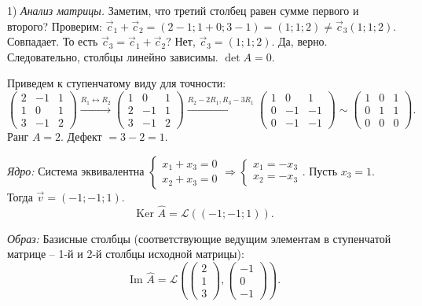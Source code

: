 \documentclass[12pt,a4paper]{article}
\theoremstyle{plain}
\theoremstyle{definition}
\begin{document}
\begin{solbox}
    1) \textit{Анализ матрицы.}
    Заметим, что третий столбец равен сумме первого и второго? Проверим:
    $\vec{c}_1 + \vec{c}_2 = (2-1; 1+0; 3-1) = (1; 1; 2) \neq \vec{c}_3(1; 1; 2)$. Совпадает.
    То есть $\vec{c}_3 = \vec{c}_1 + \vec{c}_2$? Нет, $\vec{c}_3=(1;1;2)$. Да, верно.
    Следовательно, столбцы линейно зависимы. $\det A = 0$.
    
    Приведем к ступенчатому виду для точности:
    \[
    \begin{pmatrix} 2 & -1 & 1 \\ 1 & 0 & 1 \\ 3 & -1 & 2 \end{pmatrix} \xrightarrow{R_1 \leftrightarrow R_2} \begin{pmatrix} 1 & 0 & 1 \\ 2 & -1 & 1 \\ 3 & -1 & 2 \end{pmatrix} \xrightarrow{R_2-2R_1, R_3-3R_1} \begin{pmatrix} 1 & 0 & 1 \\ 0 & -1 & -1 \\ 0 & -1 & -1 \end{pmatrix} \sim \begin{pmatrix} 1 & 0 & 1 \\ 0 & 1 & 1 \\ 0 & 0 & 0 \end{pmatrix}.
    \]
    Ранг $A = 2$. Дефект $= 3 - 2 = 1$.

    \textit{Ядро:} Система эквивалентна $\begin{cases} x_1 + x_3 = 0 \\ x_2 + x_3 = 0 \end{cases} \Rightarrow \begin{cases} x_1 = -x_3 \\ x_2 = -x_3 \end{cases}$.
    Пусть $x_3 = 1$. Тогда $\vec{v} = (-1; -1; 1)$.
    \[
    \text{Ker } \hat{A} = \mathcal{L}((-1; -1; 1)).
    \]

    \textit{Образ:} Базисные столбцы (соответствующие ведущим элементам в ступенчатой матрице -- 1-й и 2-й столбцы исходной матрицы):
    \[
    \text{Im } \hat{A} = \mathcal{L} \left( \begin{pmatrix} 2 \\ 1 \\ 3 \end{pmatrix}, \begin{pmatrix} -1 \\ 0 \\ -1 \end{pmatrix} \right).
    \]


\end{solbox}
\end{document}

